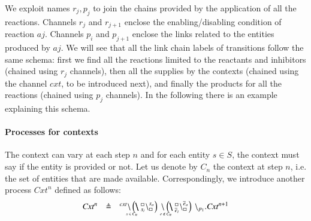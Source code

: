 We exploit names $r_j,p_j$ to join the chains provided by the application of all the reactions. 
Channels $r_j$ and $r_{j+1}$ enclose the enabling/disabling condition of reaction $aj$.
Channels $p_i$ and $p_{j+1}$ enclose the links related to the entities produced by $aj$.
We will see that all the link chain labels of transitions follow the same schema: first we find all the reactions limited to the reactants and inhibitors (chained using $r_j$ channels), then all the supplies by the contexts (chained using the channel $\mathit{cxt}$, to be introduced next), and finally the products for all the reactions (chained using $p_j$ channels). 
In the following there is an example explaining this schema.

\paragraph{Processes for contexts}
The context can vary at each step $n$ and for each entity $s \in S$, the context must say if the entity is provided or not. Let us denote by $C_n$ the context at step $n$, i.e. the set of entities that are made available. Correspondingly, we introduce another process $\mathit{Cxt}^n$ defined as follows:
\[
\begin{array}{lcl}
\mathit{Cxt}^n &\defeq &
^{cxt} \backslash  \blockchain{s_i}{s_o}{s \in C_n}  \link{}{} \blockchain{\overline{e}_i}{\overline{e}_o}{e \not\in C_n}   \backslash_{p_1}. \mathit{Cxt}^{n+1}
\end{array}
\]

